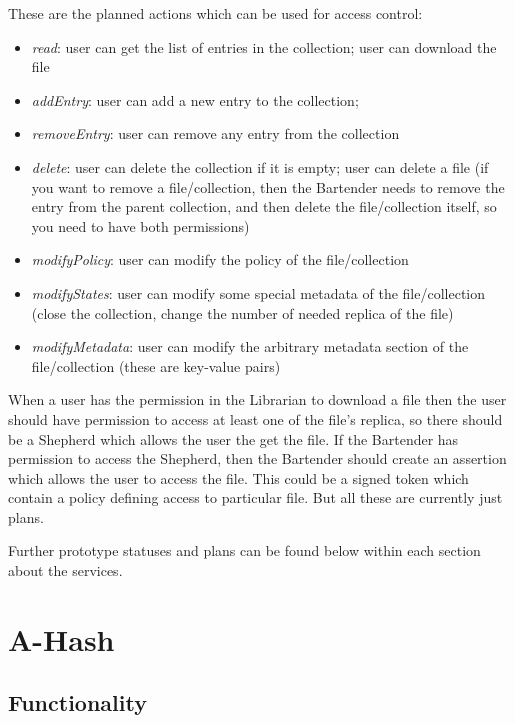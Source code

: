 \documentclass{book}
\begin{document}
These are the planned actions which can be used for access control:
\begin{itemize}
    \item \emph{read}: user can get the list of entries in the collection; user can download the file
    \item \emph{addEntry}: user can add a new entry to the collection;
    \item \emph{removeEntry}: user can remove any entry from the collection 
    \item \emph{delete}: user can delete the collection if it is empty; user can delete a file (if you want to remove a file/collection, then the Bartender needs to remove the entry from the parent collection, and then delete the file/collection itself, so you need to have both permissions)
    \item \emph{modifyPolicy}: user can modify the policy of the file/collection
    \item \emph{modifyStates}: user can modify some special metadata of the file/collection (close the collection, change the number of needed replica of the file)
    \item \emph{modifyMetadata}: user can modify the arbitrary metadata section of the file/collection (these are key-value pairs)
\end{itemize}
When a user has the permission in the Librarian to download a file then the user should have permission to access at least one of the file's replica, so there should be a Shepherd which allows the user the get the file. If the Bartender has permission to access the Shepherd, then the Bartender should create an assertion which allows the user to access the file. This could be a signed token which contain a policy defining access to particular file. But all these are currently just plans.


Further prototype statuses and plans can be found below within each section about the services.

\newpage

\section{A-Hash} %
\label{sec:a_hash}

\subsection{Functionality} %
\end{document}
